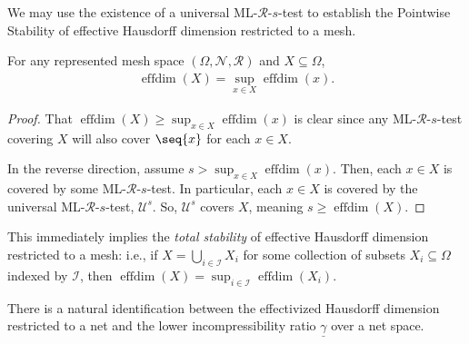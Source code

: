We may use the existence of a universal ML-$\mathscr{R}$-$s$-test to establish the Pointwise Stability of effective Hausdorff dimension restricted to a mesh.
\begin{proposition}
    \label{prop:pointwise_stability_effective_dimension}
    For any represented mesh space $(\Omega, \mathcal{N}, \mathscr{R})$ and $X \subseteq \Omega$,
    \begin{align*}
        \operatorname{effdim}(X) = \sup_{x \in X} \operatorname{effdim}(x).
    \end{align*}
\end{proposition}
\begin{proof}
    That $\operatorname{effdim}(X) \geq \sup_{x \in X} \operatorname{effdim}(x)$ is clear since any ML-$\mathscr{R}$-$s$-test covering $X$ will also cover $\seq{x}$ for each $x \in X$. 

    In the reverse direction, assume $s > \sup_{x \in X} \operatorname{effdim}(x)$. Then, each $x \in X$ is covered by some ML-$\mathscr{R}$-$s$-test. In particular, each $x \in X$ is covered by the universal ML-$\mathscr{R}$-$s$-test, $\mathcal{U}^s$. So, $\mathcal{U}^s$ covers $X$, meaning $s \geq \operatorname{effdim}(X)$. 
\end{proof}

This immediately implies the \textit{total stability} of effective Hausdorff dimension restricted to a mesh: i.e., if $X = \bigcup_{i \in \mathcal{I}} X_i$ for some collection of subsets $X_i \subseteq \Omega$ indexed by $\mathcal{I}$, then $\operatorname{effdim}(X) = \sup_{i \in \mathcal{I}} \operatorname{effdim}(X_i)$.

There is a natural identification between the effectivized Hausdorff dimension restricted to a net and the lower incompressibility ratio $\underline{\gamma}$ over a net space.

